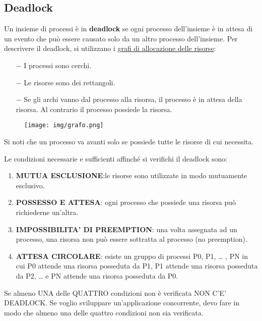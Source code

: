 \documentclass{article}
\begin{document}
\subsection{Deadlock}
\noindent Un insieme di processi è in \textbf{deadlock} se ogni processo dell'insieme è in attesa di un evento che può essere causato 
solo da un altro processo dell'insieme.
Per descrivere il deadlock, si utilizzano i \underline{grafi di allocazione delle risorse}:
\begin{itemize}
    \item[$-$] I processi sono cerchi.
    \item[$-$] Le risorse sono dei rettangoli.
    \item[$-$] Se gli archi vanno dal processo alla risorsa, il processo è in attesa della risorsa. Al contrario il processo possiede la risorsa. 
\end{itemize}


\begin{figure}[h!]
    \begin{center}
        \texttt{[image: img/grafo.png]}     
    \end{center}
\end{figure}

\noindent Si noti che un processo va avanti solo se possiede tutte le risorse di cui necessita.
\medskip

\noindent Le condizioni necessarie e sufficienti affinché si verifichi il deadlock sono:
\begin{enumerate}
    \item \textbf{MUTUA ESCLUSIONE}:le risorse sono utilizzate in modo mutuamente esclusivo.
    \item \textbf{POSSESSO E ATTESA}: ogni processo che possiede una risorsa può richiederne un'altra.
    \item \textbf{IMPOSSIBILITA' DI PREEMPTION}: una volta assegnata ad un processo, una risorsa non può essere sottratta 
    al processo (no preemption).
    \item \textbf{ATTESA CIRCOLARE}: esiste un gruppo di processi {P0, P1, … , PN} in cui P0 attende una risorsa posseduta da 
    P1, P1 attende una risorsa posseduta da P2, … e PN attende una risorsa posseduta da P0.
\end{enumerate}
\noindent Se almeno UNA delle QUATTRO condizioni non è verificata NON C'E' DEADLOCK. 
Se voglio sviluppare un'applicazione concorrente, devo fare in modo che almeno una delle quattro condizioni non sia verificata.
\end{document}
